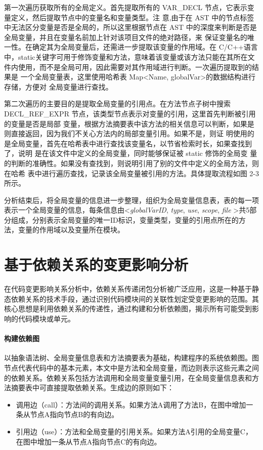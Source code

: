 第一次遍历获取所有的全局定义。首先提取所有的
VAR\_DECL 节点，它表示变量定义，然后提取节点中的变量名和变量类型。注
意,由于在 AST 中的节点标签中无法区分变量是否是全局的，所以这里根据节点在 AST
中的深度来判断是否是全局变量，并且在变量名前加上针对该项目文件的绝对路径，来
保证变量名的唯一性。在确定其为全局变量后，还需进一步提取该变量的作用域。在
C/C++语言中，static关键字可用于修饰变量和方法，意味着该变量或该方法只能在其所在文
件内使用，而不是全局可用，因此需要对其作用域进行判断。一次遍历提取到的结果是
一个全局变量表，这里使用哈希表 Map<Name, globalVar>的数据结构进行存储，方便对
全局变量进行查找。

第二次遍历的主要目的是提取全局变量的引用点。在方法节点子树中搜索
DECL\_REF\_EXPR 节点，该类型节点表示对变量的引用，这里首先判断被引用的变量是否是局部
变量，根据方法摘要表中该方法的相关信息可以判断，如果是则直接返回，因为我们不关心方法内的局部变量引用。如果不是，则证
明使用的是全局变量，首先在哈希表中进行查找该变量名，以节省检索时长，如果查找到了，说明
是在该文件中定义的全局变量，同时能够保证被 static 修饰的全局变
量的判断的准确性。如果没有查找到，则说明引用了别的文件中定义的全局方法，则在哈希
表中进行遍历查找，记录该全局变量被引用的方法。具体提取流程如图 2-3 所示。

分析结束后，将全局变量的信息进一步整理，组织为全局变量信息表，表的每一项表示一个全局变量的信息，每条信息由\textless \textit{globalVarID}, \textit{type}, \textit{use}, \textit{scope}, \textit{file}  \textgreater 共5部分组成，分别表示全局变量的唯一ID标识，变量类型，变量的引用点所在的方法，变量的作用域以及变量所在模块。



\section{基于依赖关系的变更影响分析}

在代码变更影响关系分析中，依赖关系传递闭包分析被广泛应用，这是一种基于静态依赖关系的技术手段，通过识别代码模块间的关联性划定受变更影响的范围\cite{2021Improving}。其核心思想是利用依赖关系的传递性，通过构建和分析依赖图，揭示所有可能受到影响的代码模块或单元。

\paragraph{构建依赖图}

以抽象语法树、全局变量信息表和方法摘要表为基础，构建程序的系统依赖图。图节点代表代码中的基本元素，本文中是方法和全局变量，而边则表示这些元素之间的依赖关系。依赖关系包括方法调用和全局变量变量引用，在全局变量信息表和方法摘要表中可直接提取依赖关系。生成边的原则如下：
\begin{itemize}
    \item 调用边（call）：方法间的调用关系。如果方法A调用了方法B，在图中增加一条从节点A指向节点B的有向边。
    
    \item 引用边（use）：方法和全局变量的引用关系。如果方法A引用的全局变量C，在图中增加一条从节点A指向节点C的有向边。
\end{itemize}

